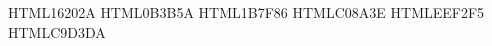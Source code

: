 \definecolor{PInk}  {HTML}{16202A}   %
\definecolor{PDeep} {HTML}{0B3B5A}   %
\definecolor{PTeal} {HTML}{1B7F86}   %
\definecolor{PSand} {HTML}{C08A3E}   %
\definecolor{PMist} {HTML}{EEF2F5}   %
\definecolor{PRule} {HTML}{C9D3DA}   %
